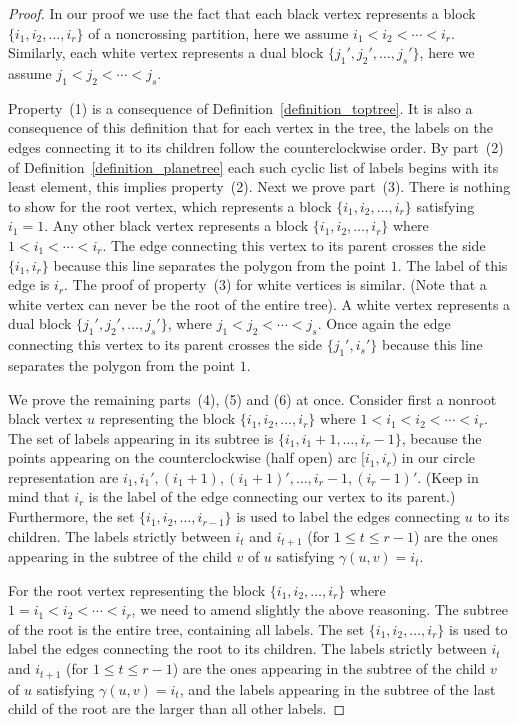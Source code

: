 \documentclass[11pt]{amsart}
\numberwithin{equation}{section}
\begin{document}
\begin{proof}
In our proof we use the fact that each black vertex represents a block  
$\{i_{1},i_{2},\ldots,i_{r}\}$ of a noncrossing partition, here we assume
$i_{1}<i_{2}<\cdots<i_{r}$. Similarly, each white vertex represents a dual
block $\{j_{1}',j_{2}',\ldots,j_{s}'\}$, here we assume
$j_{1}<j_{2}<\cdots<j_{s}$. 

Property~(1) is a consequence of
Definition~\ref{definition_toptree}. It is also a consequence of this
definition that for each vertex in the tree, the labels on the edges
connecting it to its children follow the counterclockwise order. By
part~(2) of Definition~\ref{definition_planetree} each such cyclic list of
labels begins with its least element, this implies property~(2).
Next we prove part~(3). There is nothing to show for the root
vertex, which represents a block $\{i_{1},i_{2},\ldots,i_{r}\}$ satisfying $i_{1}=1$. 
Any other black vertex represents a block $\{i_{1},i_{2},\ldots,i_{r}\}$ 
where $1<i_{1}<\cdots<i_{r}$. The edge connecting this vertex to its
parent crosses the side $\{i_{1},i_{r}\}$ because this line separates the
polygon from the point $1$. The label of this edge is $i_{r}$. The proof
of property~(3) for white vertices is similar. (Note that a
white vertex can never be the root of the entire tree). A white vertex
represents a dual block $\{j_{1}',j_{2}',\ldots,j_{s}'\}$, where 
$j_{1}<j_{2}<\cdots<j_{s}$. Once again the edge
connecting this vertex to its parent crosses the side $\{j_{1}',i_{s}'\}$
because this line separates the polygon from the point $1$.

We prove the remaining parts~(4), (5) and (6) at once. Consider first a
nonroot black vertex $u$ representing the block  $\{i_{1},i_{2},\ldots,i_{r}\}$ where 
$1<i_{1}<i_{2}<\cdots<i_{r}$. The set of labels appearing in its subtree is 
$\{i_{1},i_{1}+1,\ldots,i_{r}-1\}$, because the points appearing on the
counterclockwise (half open) arc $[i_{1},i_{r})$ in our circle representation are
$i_{1},i_{1}',(i_{1}+1),(i_{1}+1)',\ldots,i_{r}-1, (i_{r}-1)'$. (Keep in mind that
$i_{r}$ is the label of the edge connecting our vertex to its parent.)
  Furthermore, the set $\{i_{1},i_{2},\ldots,i_{r-1}\}$ is 
used to label the edges connecting $u$ to its children. The labels
strictly between $i_{t}$ and $i_{t+1}$ (for $1\leq t\leq r-1$) are the
ones appearing in the subtree of the child $v$ of $u$ satisfying
$\gamma(u,v)=i_{t}$.  

For the root vertex representing the block  $\{i_{1},i_{2},\ldots,i_{r}\}$ where 
$1=i_{1}<i_{2}<\cdots<i_{r}$, we need to amend slightly the above
reasoning. The subtree of the root is the entire tree, containing all
labels. The set $\{i_{1},i_{2},\ldots,i_{r}\}$ is 
used to label the edges connecting the root to its children. The labels
strictly between $i_{t}$ and $i_{t+1}$ (for $1\leq t\leq r-1$) are the
ones appearing in the subtree of the child $v$ of $u$ satisfying
$\gamma(u,v)=i_{t}$, and the labels appearing in the subtree of the last
child of the root are the larger than all other labels. 


\end{proof}
\end{document}
